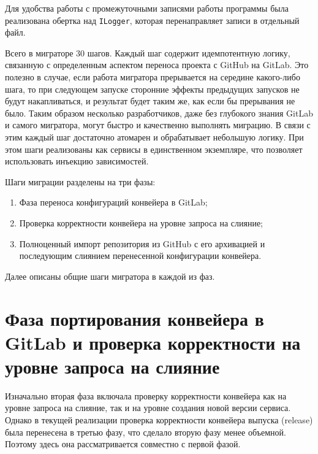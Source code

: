 Для удобства работы с промежуточными записями работы программы была реализована обертка над \texttt{ILogger},
которая перенаправляет записи в отдельный файл.

Всего в миграторе 30 шагов.
Каждый шаг содержит идемпотентную логику, связанную с определенным аспектом переноса проекта с GitHub на GitLab.
Это полезно в случае, если работа мигратора прерывается на середине какого-либо шага, то при следующем запуске сторонние эффекты предыдущих запусков не будут накапливаться, и результат будет таким же, как если бы прерывания не было.
Таким образом несколько разработчиков, даже без глубокого знания GitLab и самого мигратора, могут быстро и качественно выполнять миграцию.
В связи с этим каждый шаг достаточно атомарен и обрабатывает небольшую логику.
При этом шаги реализованы как сервисы в единственном экземпляре, что позволяет использовать инъекцию зависимостей.

Шаги миграции разделены на три фазы:
\begin{enumerate}
  \item Фаза переноса конфигураций конвейера в GitLab;
  \item Проверка корректности конвейера на уровне запроса на слияние;
  \item Полноценный импорт репозитория из GitHub с его архивацией и последующим слиянием перенесенной конфигурации конвейера.
\end{enumerate}

Далее описаны общие шаги мигратора в каждой из фаз.

\section{Фаза портирования конвейера в GitLab и проверка корректности на уровне запроса на слияние} \label{sec:first-and-second-phases}
Изначально вторая фаза включала проверку корректности конвейера как на уровне запроса на слияние, так и на уровне создания новой версии сервиса.
Однако в текущей реализации проверка корректности конвейера выпуска (release) была перенесена в третью фазу, что сделало вторую фазу менее объемной.
Поэтому здесь она рассматривается совместно с первой фазой.

